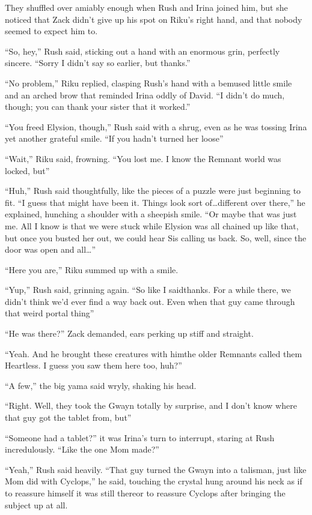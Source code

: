 They shuffled over amiably enough when Rush and Irina joined him, but she noticed that Zack didn't give up his spot on Riku's right hand, and that nobody seemed to expect him to.

``So, hey,'' Rush said, sticking out a hand with an enormous grin, perfectly sincere. ``Sorry I didn't say so earlier, but thanks.''

``No problem,'' Riku replied, clasping Rush's hand with a bemused little smile and an arched brow that reminded Irina oddly of David. ``I didn't do much, though; you can thank your sister that it worked.''

``You freed Elysion, though,'' Rush said with a shrug, even as he was tossing Irina yet another grateful smile. ``If you hadn't turned her loose\textemdash''

``Wait,'' Riku said, frowning. ``You lost me. I know the Remnant world was locked, but\textemdash''

``Huh,'' Rush said thoughtfully, like the pieces of a puzzle were just beginning to fit. ``I guess that might have been it. Things look sort of\ldots different over there,'' he explained, hunching a shoulder with a sheepish smile. ``Or maybe that was just me. All I know is that we were stuck while Elysion was all chained up like that, but once you busted her out, we could hear Sis calling us back. So, well, since the door was open and all\ldots''

``Here you are,'' Riku summed up with a smile.

``Yup,'' Rush said, grinning again. ``So like I said\textemdash thanks. For a while there, we didn't think we'd ever find a way back out. Even when that guy came through that weird portal thing\textemdash''

``He was there?'' Zack demanded, ears perking up stiff and straight.

``Yeah. And he brought these creatures with him\textemdash the older Remnants called them Heartless. I guess you saw them here too, huh?''

``A few,'' the big yama said wryly, shaking his head.

``Right. Well, they took the Gwayn totally by surprise, and I don't know where that guy got the tablet from, but\textemdash''

``Someone had a tablet?'' it was Irina's turn to interrupt, staring at Rush incredulously. ``Like the one Mom made?''

``Yeah,'' Rush said heavily. ``That guy turned the Gwayn into a talisman, just like Mom did with Cyclops,'' he said, touching the crystal hung around his neck as if to reassure himself it was still there\textemdash or to reassure Cyclops after bringing the subject up at all.

